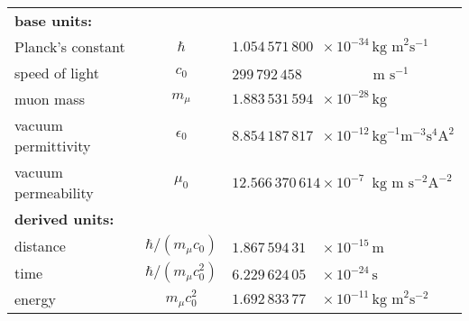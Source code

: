 \begin{table*}[h]
\caption*{Overview of the SI-values of the base units and important derived units for the muonic natural units. SI Values for $\hbar$, $c$, $m_\mu$, $\epsilon_0$, $\mu_0$ are taken from Ref.~\cite{codata}.}
\centering\setcellgapes{4pt}\makegapedcells
\begin{tabular}{lc|ll}
\\
{\bf base units:}\\
Planck's constant &$\hbar$ & \multicolumn{2}{l}{$1.054\,571\,800 \phantom{1}\times 10^{-34} \,\text{kg m}^2 \text{s}^{-1}$} \\
speed of light &$c_0$ & \multicolumn{2}{l}{$299\,792\,458\phantom{1} \,\,\phantom{\times 1001 ^{-34}} \text{m s}^{-1}$}\\
muon mass &$m_\mu$ & \multicolumn{2}{l}{$1.883\,531\,594\phantom{1} \times 10^{-28} \,\text{kg}$}\\
vacuum permittivity &$\epsilon_0$ & \multicolumn{2}{l}{$8.854\,187\,817\phantom{1} \times 10^{-12} \,  \text{kg}^{-1} \text{m}^{-3}\text{s}^4\text{A}^2$}\\
vacuum permeability &$\mu_0$ & \multicolumn{2}{l}{$12.566\,370\,614 \times 10^{-7\phantom{1}} \,\text{kg m} \text{ s}^{-2}\text{A}^{-2}$}\\[15pt]
{\bf derived units:}\\
distance & $\hbar/(m_\mu c_0)$ & $1.867\,594\,31\phantom{11}\times 10^{-15}\,\text{m}$\\
time & $\hbar /(m_\mu c_0^2)$ & $6.229\,624\,05\phantom{11}\times 10^{-24}\,\text{s}$\\
energy & $m_\mu c_0^2$ & $1.692\,833\,77\phantom{11}\times 10^{-11}\,\text{kg m}^2\text{s}^{-2}$\\
\end{tabular}
\end{table*}




































